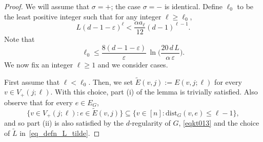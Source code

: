\documentclass[11pt,leqno]{amsart}
\theoremstyle{remark}
\theoremstyle{plain}
\begin{document}
\begin{proof}
We will assume that $\sigma = +$; the case $\sigma = -$ is identical. Define $\ell_0$ to be
the least positive integer such that for any integer $\ell\geqslant\ell_0$,
\begin{equation} \label{eqkt012}
L(d-1-\varepsilon)^\ell < \frac{\alpha a_\ell}{12}(d-1)^{\ell-1}.
\end{equation}
Note that
\begin{equation}\label{eqkt013}
\ell_0\leqslant \frac{8(d-1-\varepsilon)}{\varepsilon}\, \ln\Big(\frac{20\, d\, L}{\alpha\, \varepsilon}\Big).
\end{equation}
We now fix an integer $\ell\geqslant 1$ and we consider cases.

First assume that $\ell<\ell_0$. Then, we set $\tilde E(v,j):= E(v,j;\ell)$ for every
$v\in V_{+}(j;\ell)$. With this choice, part (i) of the lemma is trivially satisfied.
Also observe that for every $e\in E_G$,
$$ \big\{v\in V_{+}(j;\ell)\colon e\in \tilde E(v,j)\big\}
\subseteq \big\{v\in [n]\colon \mathrm{dist}_G(v,e)\leqslant \ell-1\big\}, $$
and so part (ii) is also satisfied by the $d$-regularity of $G$, \eqref{eqkt013} and
the choice of $\tilde{L}$ in~\eqref{eq_defn_L_tilde}.


\end{proof}
\end{document}
